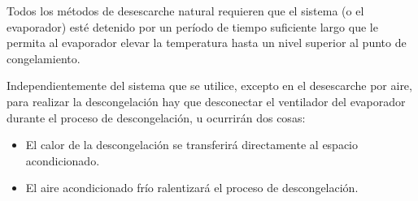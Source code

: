 			Todos los métodos de desescarche natural requieren que el sistema (o el evaporador) esté detenido por un período de tiempo suficiente largo que le permita al evaporador elevar la temperatura hasta un nivel superior al punto de congelamiento.
			
			Independientemente del sistema que se utilice, excepto en el desescarche por aire, para realizar la descongelación hay que desconectar el ventilador del evaporador durante el proceso de descongelación, u ocurrirán dos cosas:
			\begin{itemize}
				\item El calor de la descongelación se transferirá directamente al espacio acondicionado.
				\item El aire acondicionado frío ralentizará el proceso de descongelación.
			\end{itemize}
			
